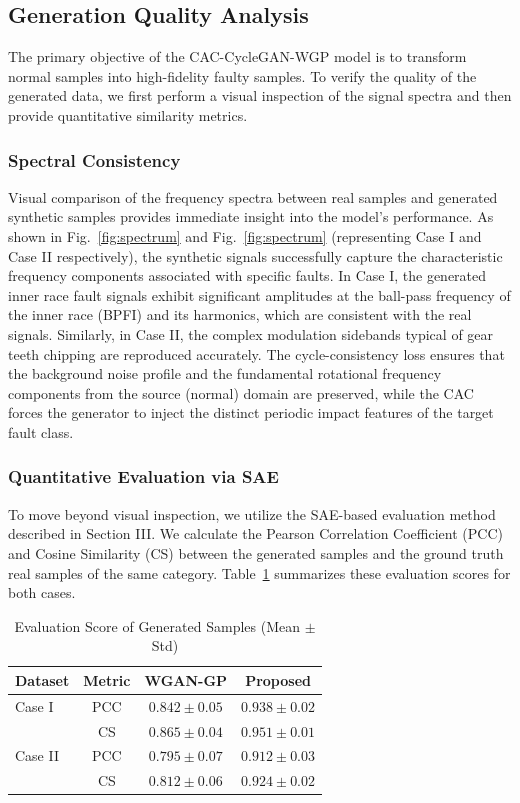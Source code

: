 \subsection{Generation Quality Analysis}
The primary objective of the CAC-CycleGAN-WGP model is to transform normal samples into high-fidelity faulty samples. To verify the quality of the generated data, we first perform a visual inspection of the signal spectra and then provide quantitative similarity metrics.

\subsubsection{Spectral Consistency}
Visual comparison of the frequency spectra between real samples and generated synthetic samples provides immediate insight into the model's performance. As shown in Fig.~\ref{fig:spectrum} and Fig.~\ref{fig:spectrum} (representing Case I and Case II respectively), the synthetic signals successfully capture the characteristic frequency components associated with specific faults. In Case I, the generated inner race fault signals exhibit significant amplitudes at the ball-pass frequency of the inner race (BPFI) and its harmonics, which are consistent with the real signals. Similarly, in Case II, the complex modulation sidebands typical of gear teeth chipping are reproduced accurately. The cycle-consistency loss ensures that the background noise profile and the fundamental rotational frequency components from the source (normal) domain are preserved, while the CAC forces the generator to inject the distinct periodic impact features of the target fault class.

\subsubsection{Quantitative Evaluation via SAE}
To move beyond visual inspection, we utilize the SAE-based evaluation method described in Section III. We calculate the Pearson Correlation Coefficient (PCC) and Cosine Similarity (CS) between the generated samples and the ground truth real samples of the same category. Table~\ref{tab:gen_scores} summarizes these evaluation scores for both cases.

\begin{table}[htbp]
\centering
\caption{Evaluation Score of Generated Samples (Mean $\pm$ Std)}
\label{tab:gen_scores}
\begin{tabular}{lccc}
\hline
\textbf{Dataset} & \textbf{Metric} & \textbf{WGAN-GP} & \textbf{Proposed} \\ \hline
Case I & PCC & $0.842 \pm 0.05$ & $0.938 \pm 0.02$ \\
       & CS  & $0.865 \pm 0.04$ & $0.951 \pm 0.01$ \\ \hline
Case II & PCC & $0.795 \pm 0.07$ & $0.912 \pm 0.03$ \\
        & CS  & $0.812 \pm 0.06$ & $0.924 \pm 0.02$ \\
\hline
\end{tabular}
\end{table}

